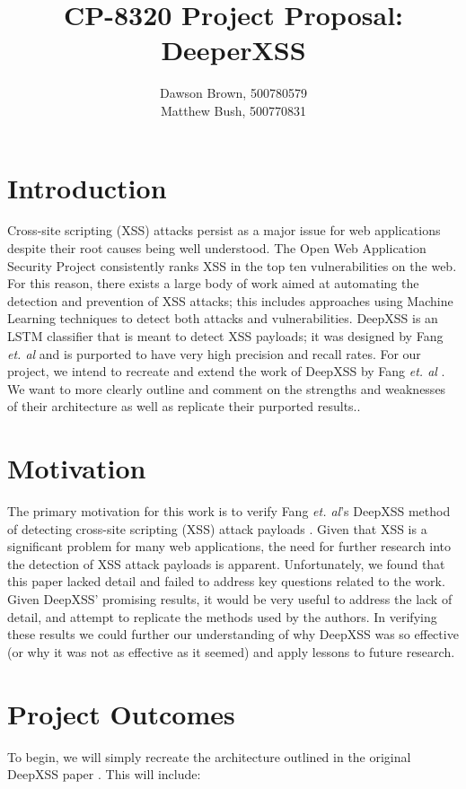 \documentclass{llncs}
\title{CP-8320 Project Proposal: DeeperXSS}
\author{Dawson Brown, 500780579\\Matthew Bush, 500770831}
\institute{Ryerson University}
\date{}
\begin{document}
\maketitle
\pagestyle{plain}


\section{Introduction}
Cross-site scripting (XSS) attacks persist as a major issue for web applications despite their root causes being well understood. The Open Web Application Security Project consistently ranks XSS in the top ten vulnerabilities on the web. For this reason, there exists a large body of work aimed at automating the detection and prevention of XSS attacks; this includes approaches using Machine Learning techniques to detect both attacks and vulnerabilities. DeepXSS is an LSTM classifier that is meant to detect XSS payloads; it was designed by Fang \textit{et. al} and is purported to have very high precision and recall rates. For our project, we intend to recreate and extend the work of DeepXSS by Fang \textit{et. al} \cite{fang2018deepxss}. We want to more clearly outline and comment on the strengths and weaknesses of their architecture as well as replicate their purported results.\cite{fang2018deepxss}. 

\section{Motivation}
The primary motivation for this work is to verify Fang \textit{et. al}’s DeepXSS method of detecting cross-site scripting (XSS) attack payloads \cite{fang2018deepxss}. Given that XSS is a significant problem for many web applications, the need for further research into the detection of XSS attack payloads is apparent.  Unfortunately, we found that this paper lacked detail and failed to address key questions related to the work.  Given DeepXSS’ promising results, it would be very useful to address the lack of detail, and attempt to replicate the methods used by the authors.  In verifying these results we could further our understanding of why DeepXSS was so effective (or why it was not as effective as it seemed) and apply lessons to future research.

\section{Project Outcomes}
To begin, we will simply recreate the architecture outlined in the original DeepXSS paper \cite{fang2018deepxss}. This will include:
\end{document}
